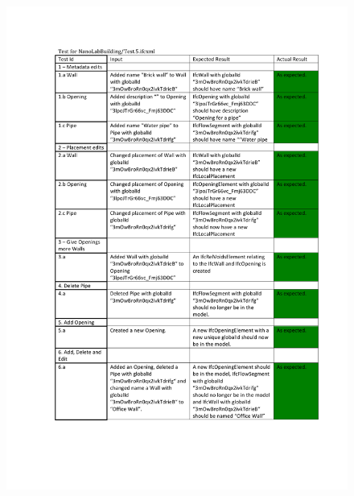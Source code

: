 \begin{figure}
    \centering
        \centerline{\includegraphics[width=150mm]{images/Test3.pdf}}
    \caption{}
    \label{fig:test3}
\end{figure}
